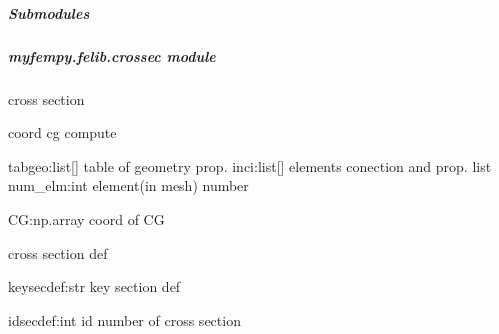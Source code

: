 \documentclass[letterpaper,10pt,english]{sphinxmanual}
\begin{document}
\subparagraph{Submodules}
\label{\detokenize{myfempy.felib:submodules}}

\subparagraph{myfempy.felib.crossec module}
\label{\detokenize{myfempy.felib:module-myfempy.felib.crossec}}\label{\detokenize{myfempy.felib:myfempy-felib-crossec-module}}
\sphinxAtStartPar
cross section

\begin{fulllineitems}
\label{\detokenize{myfempy.felib:myfempy.felib.crossec.cg_coord}}
\pysigstartsignatures
{}
\pysigstopsignatures
\sphinxAtStartPar
coord cg compute
\begin{description}
\sphinxAtStartPar
tabgeo:list{[}{]}  \textendash{} table of geometry prop.
inci:list{[}{]}    \textendash{} elements conection and prop. list
num\_elm:int    \textendash{} element(in mesh) number

\sphinxAtStartPar
CG:np.array  \textendash{} coord of CG

\end{description}

\end{fulllineitems}


\begin{fulllineitems}
\label{\detokenize{myfempy.felib:myfempy.felib.crossec.sec_def}}
\pysigstartsignatures
{}
\pysigstopsignatures
\sphinxAtStartPar
cross section def
\begin{description}
\sphinxAtStartPar
keysecdef:str \textendash{} key section def

\sphinxAtStartPar
idsecdef:int  \textendash{} id number of cross section

\end{description}

\end{fulllineitems}
\end{document}
